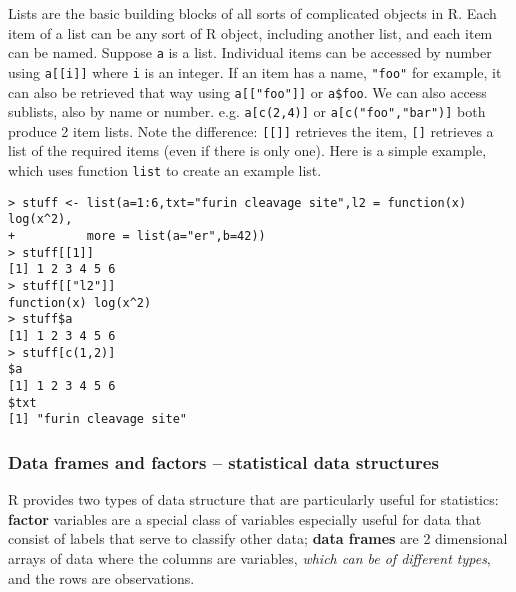 \documentclass[10pt] {article}
\theoremstyle{definition}
\begin{document}
Lists are the basic building blocks of all sorts of complicated objects in R. Each item of a list can be any sort of R object, including another list, and each item can be named. Suppose {\tt a} is a list. Individual items can be accessed by number using \lstinline+a[[i]]+ where {\tt i} is an integer. If an item has a name, \lstinline+"foo"+ for example, it can also be retrieved that way using \lstinline+a[["foo"]]+ or \lstinline+a$foo+. We can also access sublists, also by name or number. e.g. \lstinline+a[c(2,4)]+ or \lstinline+a[c("foo","bar")]+ both produce 2 item lists. Note the difference: \lstinline+[[]]+ retrieves the item, \lstinline+[]+ retrieves a list of the required items (even if there is only one). Here is a simple example, which uses function {\tt list} to create an example list.
\begin{lstlisting}
> stuff <- list(a=1:6,txt="furin cleavage site",l2 = function(x) log(x^2),
+          more = list(a="er",b=42))
> stuff[[1]]
[1] 1 2 3 4 5 6
> stuff[["l2"]]
function(x) log(x^2)
> stuff$a
[1] 1 2 3 4 5 6
> stuff[c(1,2)]
$a
[1] 1 2 3 4 5 6
$txt
[1] "furin cleavage site"
\end{lstlisting}  

\subsubsection{Data frames and factors -- statistical data structures}

R provides two types of data structure that are particularly useful for statistics: {\bf factor} variables are a special class of variables especially useful for data that consist of labels that serve to classify other data; {\bf data frames} are 2 dimensional arrays of data where the columns are variables, {\em which can be of different types}, and the rows are observations. 
\end{document}
